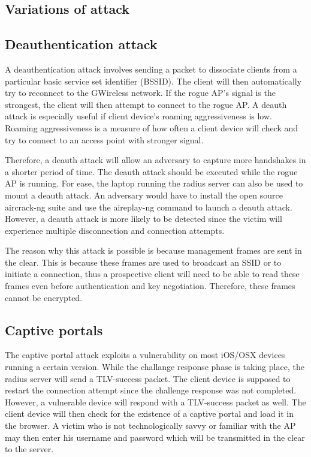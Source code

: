 \documentclass[twoside]{article}
\begin{document}
\begin{multicols}{2}
\section{Variations of attack}

\subsection{Deauthentication attack}

A deauthentication attack involves sending a packet to dissociate clients from a particular basic service set identifier (BSSID). The client will then automatically try to reconnect to the GWireless network. If the rogue AP's signal is the strongest, the client will then attempt to connect to the rogue AP.  A deauth attack is especially useful if client device's roaming aggressiveness is low. Roaming aggressiveness is a measure of how often a client device will check and try to connect to an access point with stronger signal.

Therefore, a deauth attack will allow an adversary to capture more handshakes in a shorter period of time. The deauth attack should be executed while the rogue AP is running. For ease, the laptop running the radius server can also be used to mount a deauth attack. An adversary would have to install the open source aircrack-ng\cite{7} suite and use the aireplay-ng command to launch a deauth attack. However, a deauth attack is more likely to be detected since the victim will experience multiple disconnection and connection attempts.

The reason why this attack is possible is because management frames are sent in the clear. This is because these frames are used to broadcast an SSID or to initiate a connection, thus a prospective client will need to be able to read these frames even before authentication and key negotiation. Therefore, these frames cannot be encrypted. 


\subsection{Captive portals}

The captive portal attack exploits a vulnerability on most iOS/OSX devices running a certain version. While the challange response phase is taking place, the radius server will send a TLV-success packet. The client device is supposed to restart the connection attempt since the challenge response was not completed. However, a vulnerable device will respond with a TLV-success packet as well. The client device will then check for the existence of a captive portal and load it in the browser. A victim who is not technologically savvy or familiar with the AP may then enter his username and password which will be transmitted in the clear to the server. 


\end{multicols}
\end{document}
